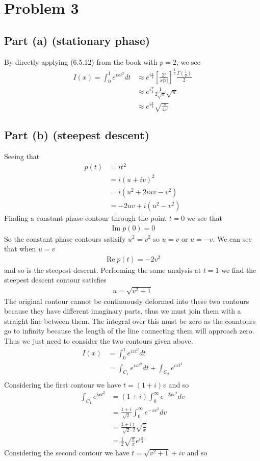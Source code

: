 \documentclass[12pt]{article}
\newcommand{\eq}[1]{\begin{align*}#1\end{align*}}
\newcommand{\on}[1]{\operatorname{#1}}
\begin{document}
\section*{Problem 3}
\subsection*{Part (a) (stationary phase)} By directly applying (6.5.12) from the book with $p = 2$, we see
\eq{
	I(x) = \int_0^1 e^{ixt^2} dt &\approx e^{i\frac{\pi}{4}} \left[\frac{2!}{x|2|}\right]^\frac{1}{2} \frac{\Gamma(\frac{1}{2})}{2}\\
	&\approx e^{i\frac{\pi}{4}} \frac{1}{2\sqrt{x}} \sqrt{\pi}\\
	&\approx e^{i\frac{\pi}{4}} \sqrt{\frac{\pi}{4x}}
}
\subsection*{Part (b) (steepest descent)} Seeing that
\eq{
	p(t) &= it^2\\
	&= i(u + iv)^2\\
	&= i(u^2 + 2iuv - v^2)\\
	&= -2uv + i(u^2 - v^2)
}
Finding a constant phase contour through the point $t = 0$ we see that
\eq{
	\on{Im} p(0) = 0
}
So the constant phase contours satisify $u^2 = v^2$ so $u = v$ or $u = -v$. We can see that when $u = v$
\eq{
	\on{Re} p(t) = -2v^2
}
and so is the steepest descent. Performing the same analysis at $t = 1$ we find the steepest descent contour satisfies
\eq{
	u = \sqrt{v^2 + 1}
}
The original contour cannot be continuously deformed into these two contours because they have different imaginary parts, thus we must join them with
a straight line between them. The integral over this must be zero as the countours go to infinity because the length of the line connecting them will
approach zero. Thus we just need to consider the two contours given above.
\eq{
	I(x) &= \int_0^1 e^{ixt^2} dt\\
	&= \int_{C_1} e^{ixt^2} dt + \int_{C_2} e^{ixt^2}\\
}
Considering the first contour we have $t = (1+i)v$ and so
\eq{
	\int_{C_1} e^{ixt^2} &= (1+i)\int_0^\infty e^{-2xv^2} dv\\
	&= \frac{1+i}{\sqrt{2}} \int_0^\infty e^{-xv^2} dv\\
	&= \frac{1+i}{\sqrt{2}} \frac{1}{2}\sqrt{\frac{\pi}{x}}\\
	&= \frac{1}{2}\sqrt{\frac{\pi}{x}}e^{i\frac{\pi}{4}}
}
Considering the second contour we have $t = \sqrt{v^2 + 1} + iv$ and so
\end{document}
